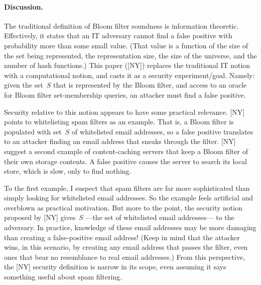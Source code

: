 \paragraph{Discussion. }
The traditional definition of Bloom filter soundness is information theoretic.  Effectively, it states that an IT adversary cannot find a false positive with probability more than some small value.  (That value is a function of the size of the set being represented, the representation size, the size of the universe, and the number of hash functions.)  This paper ([NY]) replaces the traditional IT notion with a computational notion, and casts it as a security experiment/goal.  Namely: given the set~$S$ that is represented by the Bloom filter, and access to an oracle for Bloom filter set-membership queries, an attacker must find a false positive.


Security relative to this notion appears to have some practical relevance.  [NY] points to whitelisting spam filters as an example.  That is, a Bloom filter is populated with set~$S$ of whitelisted email addresses, so a false positive translates to an attacker finding an email address that sneaks through the filter.  [NY] suggest a second example of content-caching servers that keep a Bloom filter of their own storage contents.  A false positive causes the server to search its local store, which is slow, only to find nothing. 

To the first example, I suspect that spam filters are far more sophisticated than simply looking for whitelisted email addresses.  So the example feels artificial and overblown as practical motivation.  But more to the point, the security notion proposed by [NY] gives~$S$ ---the set of whitelisted email addresses--- to the adversary.  In practice, knowledge of these email addresses may be more damaging than creating a false-positive email address! (Keep in mind that the attacker wins, in this scenario, by creating any email address that passes the filter, even ones that bear no resemblance to real email addresses.)  From this perspective, the [NY] security definition is narrow in its scope, even assuming it says something useful about spam filtering.

